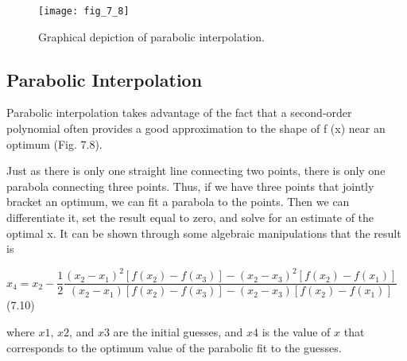 \documentclass[../main.tex]{subfiles}
\begin{document}
\begin{figure}[H]
	\centering
	\texttt{[image: fig\_7\_8]}
	\caption{\textsf{Graphical depiction of parabolic interpolation.}}
	\label{fig:fig_7_8}
\end{figure}

\subsection{Parabolic Interpolation}

\noindent Parabolic interpolation takes advantage of the fact that a second-order polynomial often
provides a good approximation to the shape of f (x) near an optimum (Fig. 7.8).

Just as there is only one straight line connecting two points, there is only one parabola
connecting three points. Thus, if we have three points that jointly bracket an optimum, we
can fit a parabola to the points. Then we can differentiate it, set the result equal to zero, and
solve for an estimate of the optimal x. It can be shown through some algebraic manipulations
that the result is
\medskip

$x_4 = x_2 - \dfrac{1}{2}\dfrac{(x_2-x_1)^2[f(x_2)-f(x_3)]-(x_2-x_3)^2[f(x_2)-f(x_1)]}{(x_2-x_1)[f(x_2)-f(x_3)]-(x_2-x_3)[f(x_2)-f(x_1)]} $ \hfill {(7.10)}
\medskip

\noindent where $x1$, $x2$, and $x3$ are the initial guesses, and $x4$ is the value of $x$ that corresponds to the
optimum value of the parabolic fit to the guesses.
\end{document}
